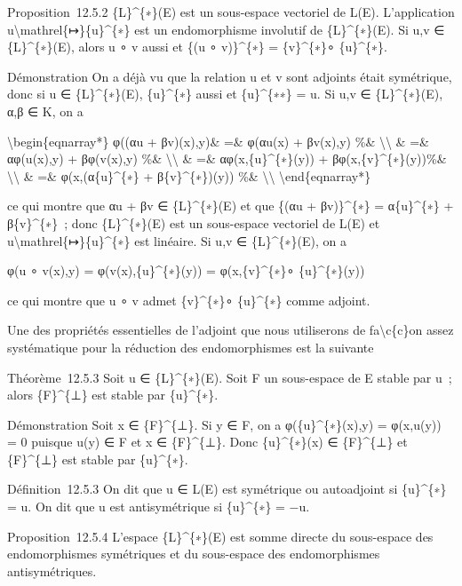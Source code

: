 \documentclass[]{article}
\begin{document}
Proposition~12.5.2 \{L\}\^{}\{∗\}(E) est un sous-espace vectoriel de
L(E). L'application u\textbackslash{}mathrel\{↦\}\{u\}\^{}\{∗\} est un
endomorphisme involutif de \{L\}\^{}\{∗\}(E). Si u,v ∈
\{L\}\^{}\{∗\}(E), alors u ∘ v aussi et \{(u ∘ v)\}\^{}\{∗\} =
\{v\}\^{}\{∗\}∘ \{u\}\^{}\{∗\}.

Démonstration On a déjà vu que la relation u et v sont adjoints était
symétrique, donc si u ∈ \{L\}\^{}\{∗\}(E), \{u\}\^{}\{∗\} aussi et
\{u\}\^{}\{∗∗\} = u. Si u,v ∈ \{L\}\^{}\{∗\}(E), α,β ∈ K, on a

\textbackslash{}begin\{eqnarray*\} φ((αu + βv)(x),y)\& =\& φ(αu(x) +
βv(x),y) \%\& \textbackslash{}\textbackslash{} \& =\& αφ(u(x),y) +
βφ(v(x),y) \%\& \textbackslash{}\textbackslash{} \& =\&
αφ(x,\{u\}\^{}\{∗\}(y)) + βφ(x,\{v\}\^{}\{∗\}(y))\%\&
\textbackslash{}\textbackslash{} \& =\& φ(x,(α\{u\}\^{}\{∗\} +
β\{v\}\^{}\{∗\})(y)) \%\& \textbackslash{}\textbackslash{}
\textbackslash{}end\{eqnarray*\}

ce qui montre que αu + βv ∈ \{L\}\^{}\{∗\}(E) et que \{(αu +
βv)\}\^{}\{∗\} = α\{u\}\^{}\{∗\} + β\{v\}\^{}\{∗\}~; donc
\{L\}\^{}\{∗\}(E) est un sous-espace vectoriel de L(E) et
u\textbackslash{}mathrel\{↦\}\{u\}\^{}\{∗\} est linéaire. Si u,v ∈
\{L\}\^{}\{∗\}(E), on a

φ(u ∘ v(x),y) = φ(v(x),\{u\}\^{}\{∗\}(y)) = φ(x,\{v\}\^{}\{∗\}∘
\{u\}\^{}\{∗\}(y))

ce qui montre que u ∘ v admet \{v\}\^{}\{∗\}∘ \{u\}\^{}\{∗\} comme
adjoint.

Une des propriétés essentielles de l'adjoint que nous utiliserons de
fa\textbackslash{}c\{c\}on assez systématique pour la réduction des
endomorphismes est la suivante

Théorème~12.5.3 Soit u ∈ \{L\}\^{}\{∗\}(E). Soit F un sous-espace de E
stable par u~; alors \{F\}\^{}\{⊥\} est stable par \{u\}\^{}\{∗\}.

Démonstration Soit x ∈ \{F\}\^{}\{⊥\}. Si y ∈ F, on a
φ(\{u\}\^{}\{∗\}(x),y) = φ(x,u(y)) = 0 puisque u(y) ∈ F et x ∈
\{F\}\^{}\{⊥\}. Donc \{u\}\^{}\{∗\}(x) ∈ \{F\}\^{}\{⊥\} et
\{F\}\^{}\{⊥\} est stable par \{u\}\^{}\{∗\}.

Définition~12.5.3 On dit que u ∈ L(E) est symétrique ou autoadjoint si
\{u\}\^{}\{∗\} = u. On dit que u est antisymétrique si \{u\}\^{}\{∗\} =
−u.

Proposition~12.5.4 L'espace \{L\}\^{}\{∗\}(E) est somme directe du
sous-espace des endomorphismes symétriques et du sous-espace des
endomorphismes antisymétriques.
\end{document}
